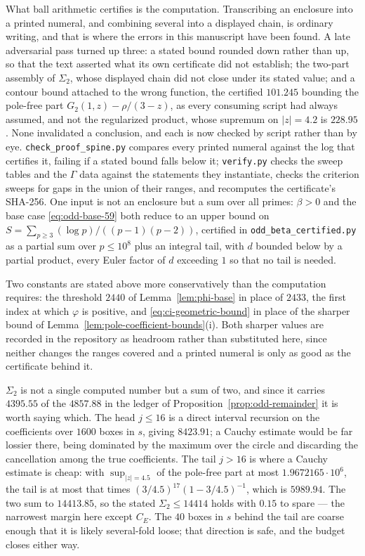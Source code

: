 \documentclass[11pt]{amsart}
\theoremstyle{plain}
\theoremstyle{definition}
\newcommand{\abs}[1]{\lvert #1\rvert}
\begin{document}
What ball arithmetic certifies is the computation. Transcribing an enclosure
into a printed numeral, and combining several into a displayed chain, is
ordinary writing, and that is where the errors in this manuscript have been
found. A late adversarial pass turned up three: a stated bound rounded down
rather than up, so that the text asserted what its own certificate did not
establish; the two-part assembly of $\Sigma_2$, whose displayed chain did not
close under its stated value; and a contour bound attached to the wrong
function, the certified $101.245$ bounding the pole-free part
$G_2(1,z)-\rho/(3-z)$, as every consuming script had always assumed, and not
the regularized product, whose supremum on $\abs z=4.2$ is $228.95$. None
invalidated a conclusion, and each is now checked by script rather than by
eye. \texttt{check\_\allowbreak proof\_\allowbreak spine.py} compares every
printed numeral against the log that certifies it, failing if a stated bound
falls below it; \texttt{verify.py} checks the sweep tables and the $\Gamma$
data against the statements they instantiate, checks the criterion sweeps for
gaps in the union of their ranges, and recomputes the certificate's SHA-256.
One input is not an enclosure but a sum over all primes: $\beta>0$ and the
base case \eqref{eq:odd-base-59} both reduce to an upper bound on
$S=\sum_{p\geq3}(\log p)/((p-1)(p-2))$, certified in
\texttt{odd\_\allowbreak beta\_\allowbreak certified.py} as a partial sum over
$p\leq10^{8}$ plus an integral tail, with $d$ bounded below by a partial
product, every Euler factor of $d$ exceeding $1$ so that no tail is needed.

Two constants are stated above more conservatively than the computation
requires: the threshold $2440$ of Lemma~\ref{lem:phi-base} in place of
$2433$, the first index at which $\varphi$ is positive, and
\eqref{eq:ci-geometric-bound} in place of the sharper bound of
Lemma~\ref{lem:pole-coefficient-bounds}(i). Both sharper values are recorded
in the repository as headroom rather than substituted here, since neither
changes the ranges covered and a printed numeral is only as good as the
certificate behind it.

\begingroup\sloppy
$\Sigma_2$ is not a single computed number but a sum of two, and since it
carries $4395.55$ of the $4857.88$ in the ledger of
Proposition~\ref{prop:odd-remainder} it is worth saying which. The head
$j\leq16$ is a direct interval recursion on the coefficients over $1600$ boxes
in $s$, giving $8423.91$; a Cauchy estimate would be far lossier there, being
dominated by the maximum over the circle and discarding the cancellation among
the true coefficients. The tail $j>16$ is where a Cauchy estimate is cheap:
with $\sup_{\abs z=4.5}$ of the pole-free part at most $1.9672165\cdot10^{6}$,
the tail is at most that times $(3/4.5)^{17}(1-3/4.5)^{-1}$, which is
$5989.94$. The two sum to $14413.85$, so the stated $\Sigma_2\leq14414$ holds
with $0.15$ to spare --- the narrowest margin here except $C_E$. The $40$ boxes
in $s$ behind the tail are coarse enough that it is likely several-fold loose;
that direction is safe, and the budget closes either way.
\endgroup
\end{document}

